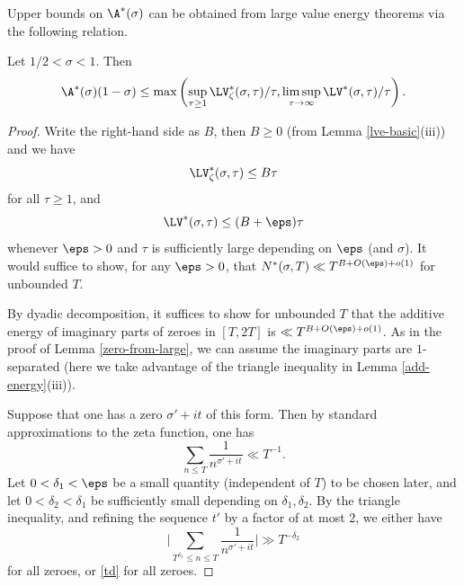 Upper bounds on $\A^*(\sigma)$ can be obtained from large value energy theorems via the following relation.

\begin{lemma}\label{zeroe-from-large}  Let $1/2 < \sigma < 1$.  Then
$$ \A^*(\sigma)(1-\sigma) \leq \max\left( \sup_{\tau \geq 1} \LV^*_\zeta(\sigma,\tau)/\tau, \limsup_{\tau \to \infty} \LV^*(\sigma,\tau)/\tau \right).$$
\end{lemma}

\begin{proof}
Write the right-hand side as $B$, then $B \geq 0$ (from Lemma \ref{lve-basic}(iii)) and we have
\begin{equation}\label{lvze-bound}
    \LV^*_\zeta(\sigma,\tau) \leq B \tau
\end{equation}
for all $\tau \geq 1$, and
\begin{equation}\label{lve-bound}
    \LV^*(\sigma,\tau) \leq (B+\eps) \tau
\end{equation}
whenever $\eps>0$ and $\tau$ is sufficiently large depending on $\eps$ (and $\sigma$).  It would suffice to show, for any $\eps>0$, that $N^*(\sigma,T) \ll T^{B+O(\eps)+o(1)}$ for unbounded $T$.

By dyadic decomposition, it suffices to show for unbounded $T$ that the additive energy of imaginary parts of zeroes in $[T,2T]$ is $\ll T^{B+O(\eps)+o(1)}$.  As in the proof of Lemma \ref{zero-from-large}, we can assume the imaginary parts are $1$-separated (here we take advantage of the triangle inequality in Lemma \ref{add-energy}(iii)).

Suppose that one has a zero $\sigma'+i t$ of this form.  Then by standard approximations to the zeta function, one has
$$ \sum_{n \leq T} \frac{1}{n^{\sigma'+it}} \ll T^{-1}.$$
Let $0 < \delta_1 < \eps$ be a small quantity (independent of $T$) to be chosen later, and let $0 < \delta_2 < \delta_1$ be sufficiently small depending on $\delta_1,\delta_2$.  By the triangle inequality, and refining the sequence $t'$ by a factor of at most $2$, we either have
$$ \bigg|\sum_{T^{\delta_1} \leq n \leq T} \frac{1}{n^{\sigma'+it}} \bigg| \gg T^{-\delta_2}$$
for all zeroes, or \eqref{td}
for all zeroes.


\end{proof}
